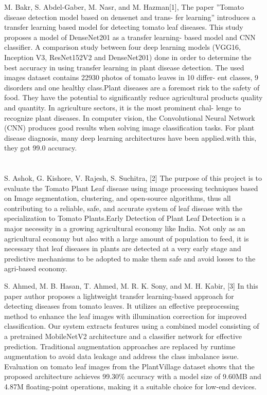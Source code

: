 \documentclass[12pt, English]{article}
\begin{document}
\begin{normalsize}
M. Bakr, S. Abdel-Gaber, M. Nasr, and M. Hazman[1], The paper ”Tomato disease detection model based on densenet and trans-
fer learning” introduces a transfer learning based model for detecting tomato leaf
diseases. This study proposes a model of DenseNet201 as a transfer learning-
based model and CNN classifier. A comparison study between four deep learning
models (VGG16, Inception V3, ResNet152V2 and DenseNet201) done in order to
determine the best accuracy in using transfer learning in plant disease detection.
The used images dataset contains 22930 photos of tomato leaves in 10 differ-
ent classes, 9 disorders and one healthy class.Plant diseases are a foremost risk
to the safety of food. They have the potential to significantly reduce agricultural
products quality and quantity. In agriculture sectors, it is the most prominent chal-
lenge to recognize plant diseases. In computer vision, the Convolutional Neural
Network (CNN) produces good results when solving image classification tasks.
For plant disease diagnosis, many deep learning architectures have been applied.with this, they got 99.0 accuracy.
\\\\\\



S. Ashok, G. Kishore, V. Rajesh, S. Suchitra, [2] 
 The purpose of this project is to evaluate the Tomato Plant Leaf 
disease using image processing techniques based on Image 
segmentation, clustering, and open-source algorithms, thus all 
contributing to a reliable, safe, and accurate system of leaf 
disease with the specialization to Tomato Plants.Early Detection of Plant Leaf Detection is a major 
necessity in a growing agricultural economy like India. Not only 
as an agricultural economy but also with a large amount of 
population to feed, it is necessary that leaf diseases in plants are 
detected at a very early stage and predictive mechanisms to be 
adopted to make them safe and avoid losses to the agri-based 
economy.
\\

\newpage

 S. Ahmed, M. B. Hasan, T. Ahmed, M. R. K. Sony, and M. H. Kabir, [3] In this paper author proposes a lightweight transfer learning-based approach for detecting diseases from tomato leaves. It utilizes an effective preprocessing method to enhance the leaf images with illumination correction for improved classification. Our system extracts features using a combined model consisting of a pretrained MobileNetV2 architecture and a classifier network for effective prediction. Traditional augmentation approaches are replaced by runtime augmentation to avoid data leakage and address the class imbalance issue. Evaluation on tomato leaf images from the PlantVillage dataset shows that the proposed architecture achieves 99.30\% accuracy with a model size of 9.60MB and 4.87M floating-point operations, making it a suitable choice for low-end devices.\\



\end{normalsize}
\end{document}

